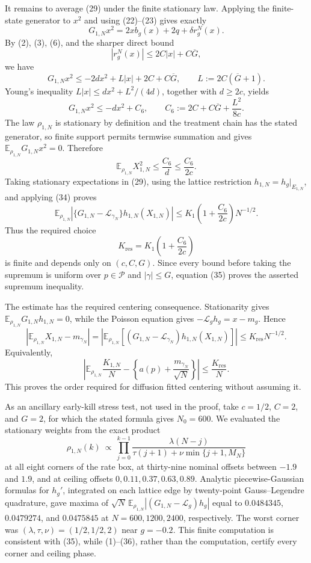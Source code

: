 It remains to average (29) under the finite stationary law.  Applying the finite-state generator to \(x^2\) and using (22)--(23) gives exactly
\[
 G_{1,N}x^2=2xb_g(x)+2q+\delta r_g^N(x).
 \tag{30}
\]
By (2), (3), (6), and the sharper direct bound
\[
 |r_g^N(x)|\leq2C|x|+C\overline G,
 \tag{31}
\]
we have
\[
 G_{1,N}x^2
 \leq-2dx^2+L|x|+2C+C\overline G,
 \qquad L:=2C(\overline G+1).
 \tag{32}
\]
Young's inequality \(L|x|\leq dx^2+L^2/(4d)\), together with \(d\geq2c\), yields
\[
 G_{1,N}x^2\leq-dx^2+C_6,
 \qquad C_6:=2C+C\overline G+\frac{L^2}{8c}.
 \tag{33}
\]
The law \(\rho_{1,N}\) is stationary by definition and the treatment chain has the stated generator, so finite support permits termwise summation and gives \(\mathbb E_{\rho_{1,N}}G_{1,N}x^2=0\).  Therefore
\[
 \mathbb E_{\rho_{1,N}}X_{1,N}^2
 \leq\frac{C_6}{d}\leq\frac{C_6}{2c}.
 \tag{34}
\]
Taking stationary expectations in (29), using the lattice restriction \(h_{1,N}=h_g|_{E_{1,N}}\), and applying (34) proves
\[
 \mathbb E_{\rho_{1,N}}
 \left|\{G_{1,N}-\mathcal L_{\gamma_N}\}
 h_{1,N}(X_{1,N})\right|
 \leq K_1\left(1+\frac{C_6}{2c}\right)N^{-1/2}.
 \tag{35}
\]
Thus the required choice
\[
 K_{\mathrm{res}}=K_1\left(1+\frac{C_6}{2c}\right)
 \tag{36}
\]
is finite and depends only on \((c,C,G)\).  Since every bound before taking the supremum is uniform over \(p\in\mathcal P\) and \(|\gamma|\leq G\), equation (35) proves the asserted supremum inequality.

The estimate has the required centering consequence.  Stationarity gives \(\mathbb E_{\rho_{1,N}}G_{1,N}h_{1,N}=0\), while the Poisson equation gives \(-\mathcal L_g h_g=x-m_g\).  Hence
\[
 \left|\mathbb E_{\rho_{1,N}}X_{1,N}-m_{\gamma_N}\right|
 =\left|\mathbb E_{\rho_{1,N}}
   [(G_{1,N}-\mathcal L_{\gamma_N})h_{1,N}(X_{1,N})]\right|
 \leq K_{\mathrm{res}}N^{-1/2}.
 \tag{37}
\]
Equivalently,
\[
 \left|\mathbb E_{\rho_{1,N}}\frac{K_{1,N}}N
 -\left\{a(p)+\frac{m_{\gamma_N}}{\sqrt N}\right\}\right|
 \leq\frac{K_{\mathrm{res}}}{N}.
 \tag{38}
\]
This proves the order required for diffusion fitted centering without assuming it.

As an ancillary early-kill stress test, not used in the proof, take \(c=1/2\), \(C=2\), and \(G=2\), for which the stated formula gives \(N_0=600\).  We evaluated the stationary weights from the exact product
\[
 \rho_{1,N}(k)\ \propto\
 \prod_{j=0}^{k-1}
 \frac{\lambda(N-j)}{\tau(j+1)+\nu\min\{j+1,M_N\}}
 \tag{39}
\]
at all eight corners of the rate box, at thirty-nine nominal offsets between \(-1.9\) and \(1.9\), and at ceiling offsets \(0,0.11,0.37,0.63,0.89\).  Analytic piecewise-Gaussian formulas for \(h_g'\), integrated on each lattice edge by twenty-point Gauss--Legendre quadrature, gave maxima of \(\sqrt N\,\mathbb E_{\rho_{1,N}}|(G_{1,N}-\mathcal L_g)h_g|\) equal to \(0.0484345\), \(0.0479274\), and \(0.0475845\) at \(N=600,1200,2400\), respectively.  The worst corner was \((\lambda,\tau,\nu)=(1/2,1/2,2)\) near \(g=-0.2\).  This finite computation is consistent with (35), while (1)--(36), rather than the computation, certify every corner and ceiling phase.
